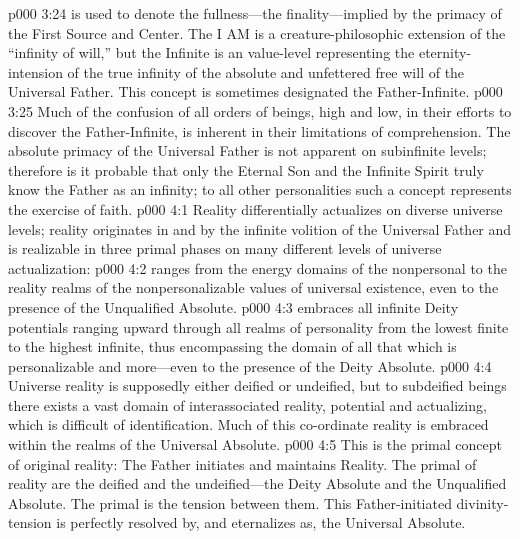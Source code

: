 \pc \vs p000 3:24  is used to denote the fullness---the finality---implied by the primacy of the First Source and Center. The  I AM is a creature\hyp{}philosophic extension of the “infinity of will,” but the Infinite is an  value\hyp{}level representing the eternity\hyp{}intension of the true infinity of the absolute and unfettered free will of the Universal Father. This concept is sometimes designated the Father\hyp{}Infinite.
\vs p000 3:25 Much of the confusion of all orders of beings, high and low, in their efforts to discover the Father\hyp{}Infinite, is inherent in their limitations of comprehension. The absolute primacy of the Universal Father is not apparent on subinfinite levels; therefore is it probable that only the Eternal Son and the Infinite Spirit truly know the Father as an infinity; to all other personalities such a concept represents the exercise of faith.
\vs p000 4:1 Reality differentially actualizes on diverse universe levels; reality originates in and by the infinite volition of the Universal Father and is realizable in three primal phases on many different levels of universe actualization:
\pc \vs p000 4:2 \bibnobreakspace {} ranges from the energy domains of the nonpersonal to the reality realms of the nonpersonalizable values of universal existence, even to the presence of the Unqualified Absolute.
\vs p000 4:3 \bibnobreakspace {} embraces all infinite Deity potentials ranging upward through all realms of personality from the lowest finite to the highest infinite, thus encompassing the domain of all that which is personalizable and more---even to the presence of the Deity Absolute.
\vs p000 4:4 \bibnobreakspace {} Universe reality is supposedly either deified or undeified, but to subdeified beings there exists a vast domain of interassociated reality, potential and actualizing, which is difficult of identification. Much of this co\hyp{}ordinate reality is embraced within the realms of the Universal Absolute.
\vs p000 4:5 This is the primal concept of original reality: The Father initiates and maintains Reality. The primal  of reality are the deified and the undeified---the Deity Absolute and the Unqualified Absolute. The primal  is the tension between them. This Father\hyp{}initiated divinity\hyp{}tension is perfectly resolved by, and eternalizes as, the Universal Absolute.

